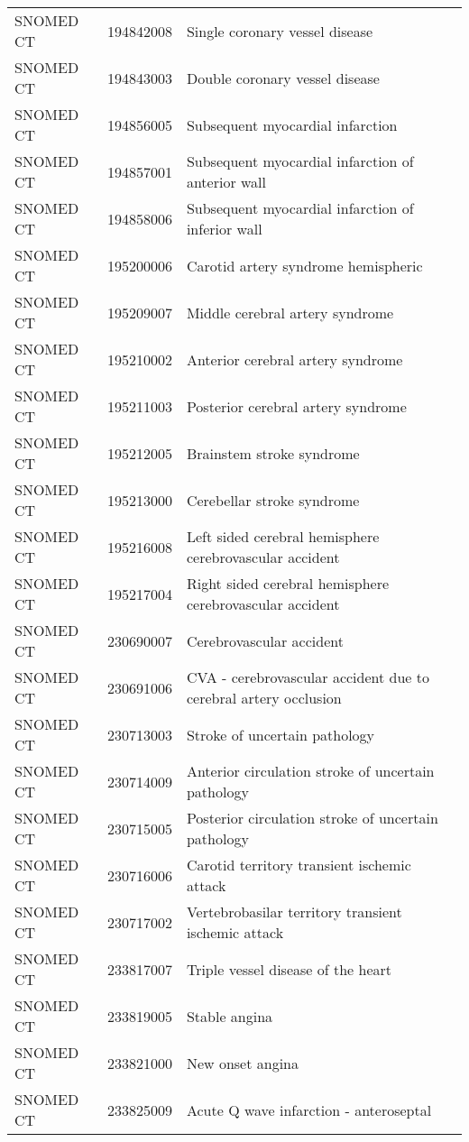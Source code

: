 \begin{longtable}{p{}p{}p{}}
  SNOMED CT & 194842008 & Single coronary vessel disease \\ 
  SNOMED CT & 194843003 & Double coronary vessel disease \\ 
  SNOMED CT & 194856005 & Subsequent myocardial infarction \\ 
  SNOMED CT & 194857001 & Subsequent myocardial infarction of anterior wall \\ 
  SNOMED CT & 194858006 & Subsequent myocardial infarction of inferior wall \\ 
  SNOMED CT & 195200006 & Carotid artery syndrome hemispheric \\ 
  SNOMED CT & 195209007 & Middle cerebral artery syndrome \\ 
  SNOMED CT & 195210002 & Anterior cerebral artery syndrome \\ 
  SNOMED CT & 195211003 & Posterior cerebral artery syndrome \\ 
  SNOMED CT & 195212005 & Brainstem stroke syndrome \\ 
  SNOMED CT & 195213000 & Cerebellar stroke syndrome \\ 
  SNOMED CT & 195216008 & Left sided cerebral hemisphere cerebrovascular accident \\ 
  SNOMED CT & 195217004 & Right sided cerebral hemisphere cerebrovascular accident \\ 
  SNOMED CT & 230690007 & Cerebrovascular accident \\ 
  SNOMED CT & 230691006 & CVA - cerebrovascular accident due to cerebral artery occlusion \\ 
  SNOMED CT & 230713003 & Stroke of uncertain pathology \\ 
  SNOMED CT & 230714009 & Anterior circulation stroke of uncertain pathology \\ 
  SNOMED CT & 230715005 & Posterior circulation stroke of uncertain pathology \\ 
  SNOMED CT & 230716006 & Carotid territory transient ischemic attack \\ 
  SNOMED CT & 230717002 & Vertebrobasilar territory transient ischemic attack \\ 
  SNOMED CT & 233817007 & Triple vessel disease of the heart \\ 
  SNOMED CT & 233819005 & Stable angina \\ 
  SNOMED CT & 233821000 & New onset angina \\ 
  SNOMED CT & 233825009 & Acute Q wave infarction - anteroseptal \\ 

\end{longtable}
